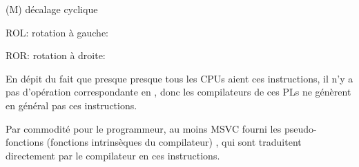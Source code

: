 \label{ROL_ROR}
\item[ROL/ROR] (M) décalage cyclique

ROL: rotation à gauche:



ROR: rotation à droite:



En dépit du fait que presque presque tous les \ac{CPU}s aient ces instructions, il n'y
a pas d'opération correspondante en \CCpp, donc les compilateurs de ces \ac{PL}s
ne génèrent en général pas ces instructions.

Par commodité pour le programmeur, au moins \ac{MSVC} fourni les pseudo-fonctions
(fonctions intrinsèques du compilateur)
 \AndENRU {}\FNMSDNROTxURL{},
qui sont traduitent directement par le compilateur en ces instructions.

